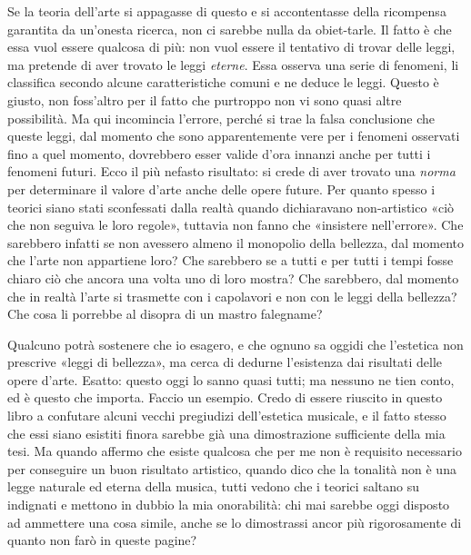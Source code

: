 \documentclass{../../lib/gs}
\begin{document}
Se la teoria dell'arte si appagasse di questo e si accontentasse della ricompensa garantita da un'onesta ricerca, non ci sarebbe nulla da obiet-tarle. Il fatto è che essa vuol essere qualcosa di più: non vuol essere il tentativo di trovar delle leggi, ma pretende di aver trovato le leggi \emph{eterne}. Essa osserva una serie di fenomeni, li classifica secondo alcune caratteristiche comuni e ne deduce le leggi. Questo è giusto, non foss'altro per il fatto che purtroppo non vi sono quasi altre possibilità. Ma qui incomincia l'errore, perché si trae la falsa conclusione che queste leggi, dal momento che sono apparentemente vere per i fenomeni osservati fino a quel momento, dovrebbero esser valide d'ora innanzi anche per tutti i fenomeni futuri. Ecco il più nefasto risultato: si crede di aver trovato una \emph{norma} per determinare il valore d'arte anche delle opere future. Per quanto spesso i teorici siano stati sconfessati dalla realtà quando dichiaravano non-artistico «ciò che non seguiva le loro regole», tuttavia non fanno che «insistere nell'errore». Che sarebbero infatti se non avessero almeno il monopolio della bellezza, dal momento che l'arte non appartiene loro? Che sarebbero se a tutti e per tutti i tempi fosse chiaro ciò che ancora una volta uno di loro mostra? Che sarebbero, dal momento che in realtà l'arte si trasmette con i capolavori e non con le leggi della bellezza? Che cosa li porrebbe al disopra di un mastro falegname?

Qualcuno potrà sostenere che io esagero, e che ognuno sa oggidi che l'estetica non prescrive «leggi di bellezza», ma cerca di dedurne l'esistenza dai risultati delle opere d'arte. Esatto: questo oggi lo sanno quasi tutti; ma nessuno ne tien conto, ed è questo che importa. Faccio un esempio. Credo di essere riuscito in questo libro a confutare alcuni vecchi pregiudizi dell'estetica musicale, e il fatto stesso che essi siano esistiti finora sarebbe già una dimostrazione sufficiente della mia tesi. Ma quando affermo che esiste qualcosa che per me non è requisito necessario per conseguire un buon risultato artistico, quando dico che la tonalità non è una legge naturale ed eterna della musica, tutti vedono che i teorici saltano su indignati e mettono in dubbio la mia onorabilità: chi mai sarebbe oggi disposto ad ammettere una cosa simile, anche se lo dimostrassi ancor più rigorosamente di quanto non farò in queste pagine?
\end{document}
